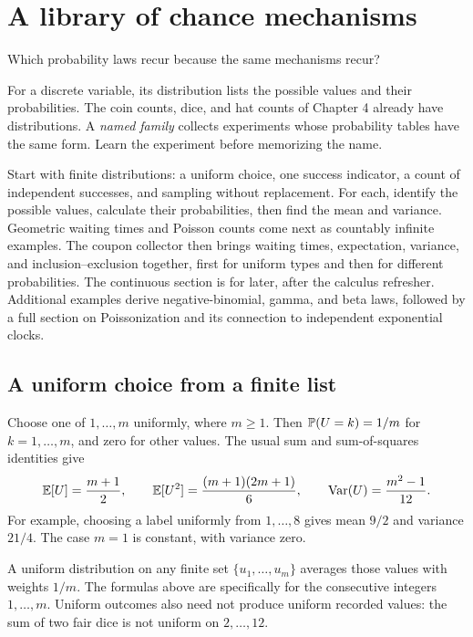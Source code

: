 \chapter{A library of chance mechanisms}
\label{ch:standard-distributions}

\begin{question}
Which probability laws recur because the same mechanisms recur?
\end{question}

For a discrete variable, its distribution lists the possible values and
their probabilities.
The coin counts, dice, and hat counts of Chapter 4 already have
distributions. A \emph{named family} collects experiments whose probability
tables have the same form. Learn the experiment before memorizing the name.

\begin{bigidea}[title={A route through the next topics}]
Start with finite distributions: a uniform choice, one success indicator,
a count of independent successes, and sampling without replacement.
For each, identify the possible values, calculate their probabilities,
then find the mean and variance.
Geometric waiting times and Poisson counts come next as countably infinite
examples. The coupon collector then brings waiting times, expectation,
variance, and inclusion--exclusion together, first for uniform types and
then for different probabilities. The continuous section is for later,
after the calculus refresher. Additional examples derive negative-binomial,
gamma, and beta laws, followed by a full section on Poissonization and
its connection to independent exponential clocks.
\end{bigidea}

\section{A uniform choice from a finite list}
\label{sec:discrete-families}

Choose one of $1,\ldots,m$ uniformly, where $m\ge1$. Then
$\P(U=k)=1/m$ for $k=1,\ldots,m$, and zero for other values.
The usual sum and sum-of-squares identities give
\[
 \E[U]=\frac{m+1}{2},\qquad
 \E[U^2]=\frac{(m+1)(2m+1)}6,\qquad
 \Var(U)=\frac{m^2-1}{12}.
\]
For example, choosing a label uniformly from $1,\ldots,8$ gives
mean $9/2$ and variance $21/4$.
The case $m=1$ is constant, with variance zero.

A uniform distribution on any finite set $\{u_1,\ldots,u_m\}$ averages
those values with weights $1/m$. The formulas above are specifically for
the consecutive integers $1,\ldots,m$.
Uniform outcomes also need not produce uniform recorded values:
the sum of two fair dice is not uniform on $2,\ldots,12$.

